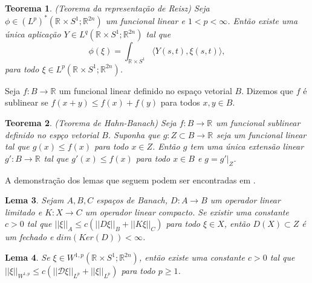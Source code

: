 \documentclass[12pt]{book}
\newtheorem{teorema}{Teorema}[section]
\newtheorem{lema}[teorema]{Lema}
\newcommand{\circulo}{S^{1}}
\newcommand{\diferencialfloerabrev}{\mathcal{D}}
\newcommand{\espacoLpcontradominio}[2]{L^{p}(#1;#2)}
\newcommand{\espacoLpretacirculo}{\espacoLpcontradominio{\retacartesianocirculo}{\real{2n}}}
\newcommand{\espacoLpadjuntoretacirculo}{L^{q}(\retacartesianocirculo;\real{2n})}
\newcommand{\espacoLpdual}{(L^{p})^{*}(\retacartesianocirculo;\real{2n})}
\newcommand{\espacosobolevcontradominio}[2]{W^{1,p}(#1;#2)}
\newcommand{\norma}[1]{||#1||}
\newcommand{\normaLp}[1]{||#1||_{L^{p}}}
\newcommand{\normaWp}[1]{||#1||_{W^{1,p}}}
\newcommand{\produtointerno}[2]{\langle #1, #2 \rangle}
\newcommand{\retacartesianocirculo}{\real{} \times \circulo}
\newcommand{\real}[1]{\mathbb{R}^{#1}}
\newcommand{\reta}{\real{}}
\begin{document}
	\begin{teorema}\label{teorema_representacao_reiz}
		(Teorema da representação de Reisz) Seja $\phi \in \espacoLpdual$ um funcional linear e $1<p<\infty$. Então existe uma única aplicação $Y \in \espacoLpadjuntoretacirculo$ tal que
		$$
		\phi(\xi) = \int_{\retacartesianocirculo}\produtointerno{Y(s,t)}{\xi(s,t)},
		$$
		para todo $\xi \in \espacoLpretacirculo$.
	\end{teorema}
	
	Seja $f: B \to \reta$ um funcional linear definido no espaço vetorial $B$. Dizemos que $f$ é sublinear se $f(x+y)\leq f(x)+f(y)$ para todos $x,y \in B$.
	
	\begin{teorema}
		(Teorema de Hahn-Banach) Seja $f:B \to \reta$ um funcional sublinear definido no espço vetorial $B$. Suponha que $g:Z \subset B \to \reta$ seja um funcional linear tal que $g(x)\leq f(x)$ para todo $x \in Z$. Então $g$ tem uma única extensão linear $g': B \to \reta$ tal que $g'(x)\leq f(x)$ para todo $x \in B$ e $g=g'|_{Z}$.
	\end{teorema}
	
	
	A demonstração dos lemas que seguem podem ser encontradas em \cite{breazis_sobolev_spaces}.
	
	\begin{lema}\label{lema_operador_limitado_imagem_fechada}
		Sejam $A,B,C$ espaços de Banach, $D:A \to B$ um operador linear limitado e $K:X \to C$ um operador linear compacto. Se existir uma constante $c>0$ tal que $\norma{\xi}_{A}\leq c(\norma{D\xi}_{B}+\norma{K\xi}_{C})$ para todo $\xi \in X$, então $D(X)\subset Z$ é um fechado e $dim(Ker(D)) < \infty$.
	\end{lema}
	
	\begin{lema}\label{lema_desigualdade_inclusao_sobolev}
		Se $\xi \in \espacosobolevcontradominio{\retacartesianocirculo}{\real{2n}}$, então existe uma constante $c>0$ tal que $\normaWp{\xi}\leq c(\normaLp{\diferencialfloerabrev \xi} +\normaLp{\xi})$ para todo $p\geq 1$.
	\end{lema}
	
\end{document}
